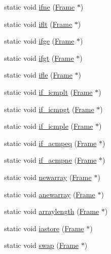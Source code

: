 \begin{DoxyCompactItemize}
\item 
static void \hyperlink{class_instruction_impl_a9f97d509bb7a8c3468ca1a9c0a524acd}{ifne} (\hyperlink{struct_frame}{Frame} $\ast$)
\item 
static void \hyperlink{class_instruction_impl_a72f91bfeca40c715f285628408842c76}{iflt} (\hyperlink{struct_frame}{Frame} $\ast$)
\item 
static void \hyperlink{class_instruction_impl_a6bd998fd499c99e63746a7fd16d4c3e2}{ifge} (\hyperlink{struct_frame}{Frame} $\ast$)
\item 
static void \hyperlink{class_instruction_impl_a2b64f604bc07538428a6cfdc7c030597}{ifgt} (\hyperlink{struct_frame}{Frame} $\ast$)
\item 
static void \hyperlink{class_instruction_impl_a9fa47a3fcd8c952a8bd799c37a0d603a}{ifle} (\hyperlink{struct_frame}{Frame} $\ast$)
\item 
static void \hyperlink{class_instruction_impl_a3a8f2793119d5c50de6442aaaafadf94}{if\+\_\+icmplt} (\hyperlink{struct_frame}{Frame} $\ast$)
\item 
static void \hyperlink{class_instruction_impl_a51699e6c210e82a9992cd9122e8525dc}{if\+\_\+icmpgt} (\hyperlink{struct_frame}{Frame} $\ast$)
\item 
static void \hyperlink{class_instruction_impl_abc59bfbb30aa90c3b6f1258d0bf769ba}{if\+\_\+icmple} (\hyperlink{struct_frame}{Frame} $\ast$)
\item 
static void \hyperlink{class_instruction_impl_aabfea4d4b7e56dc41f30c558a598ab59}{if\+\_\+acmpeq} (\hyperlink{struct_frame}{Frame} $\ast$)
\item 
static void \hyperlink{class_instruction_impl_a37471cc49830a4414300862fee23482f}{if\+\_\+acmpne} (\hyperlink{struct_frame}{Frame} $\ast$)
\item 
static void \hyperlink{class_instruction_impl_a084f1eec2cd970b1143e1824248dc2db}{newarray} (\hyperlink{struct_frame}{Frame} $\ast$)
\item 
static void \hyperlink{class_instruction_impl_a9f4ab8228c6227d41dbbac521bb79f1d}{anewarray} (\hyperlink{struct_frame}{Frame} $\ast$)
\item 
static void \hyperlink{class_instruction_impl_a3da0559cc1dd3f211fbb59e5ed678ba5}{arraylength} (\hyperlink{struct_frame}{Frame} $\ast$)
\item 
static void \hyperlink{class_instruction_impl_a234f76f77065c280add887a7dcb04e65}{iastore} (\hyperlink{struct_frame}{Frame} $\ast$)
\item 
static void \hyperlink{class_instruction_impl_a5e85e5c1cd92df938c6ee69ffc64c492}{swap} (\hyperlink{struct_frame}{Frame} $\ast$)

\end{DoxyCompactItemize}
